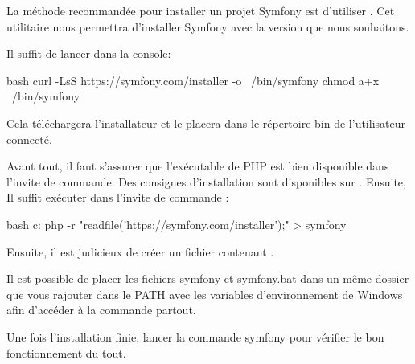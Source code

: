 \documentclass[big]{zmdocument}
\begin{document}


La méthode recommandée pour installer un projet Symfony est d'utiliser . Cet utilitaire nous permettra d'installer Symfony avec la version que nous souhaitons.





Il suffit de lancer dans la console:



\begin{CodeBlock}{bash}
 curl -LsS https://symfony.com/installer -o ~/bin/symfony
 chmod a+x ~/bin/symfony
\end{CodeBlock}



Cela téléchargera l'installateur et le placera dans le répertoire bin de l'utilisateur connecté.





Avant tout, il faut s'assurer que l'exécutable de PHP est bien disponible dans l'invite de commande. Des consignes d'installation sont disponibles sur .
Ensuite, Il suffit exécuter dans l'invite de commande :



\begin{CodeBlock}{bash}
c:\> php -r "readfile('https://symfony.com/installer');" > symfony
\end{CodeBlock}



Ensuite, il est judicieux de créer un fichier  contenant .



\begin{Information}
Il est possible de placer les fichiers symfony et symfony.bat dans un même dossier que vous rajouter dans le PATH avec les variables d'environnement de Windows afin d'accéder à la commande partout.
\end{Information}


Une fois l'installation finie, lancer la commande symfony pour vérifier le bon fonctionnement du tout.
\end{document}
